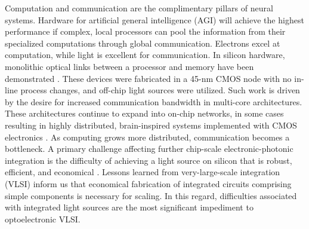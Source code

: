 \documentclass{article}
\begin{document}
\begin{multicols}{2}
Computation and communication are the complimentary pillars of neural systems. Hardware for artificial general intelligence (AGI) will achieve the highest performance if complex, local processors can pool the information from their specialized computations through global communication. Electrons excel at computation, while light is excellent for communication. In silicon hardware, monolithic optical links between a processor and memory have been demonstrated \cite{suwa2015}. These devices were fabricated in a 45-nm CMOS node with no in-line process changes, and off-chip light sources were utilized. Such work is driven by the desire for increased communication bandwidth in multi-core architectures. These architectures continue to expand into on-chip networks, in some cases resulting in highly distributed, brain-inspired systems implemented with CMOS electronics \cite{bo2000,pfgr2013,mear2014,fuga2014,payu2017,dasr2018}. As computing grows more distributed, communication becomes a bottleneck. A primary challenge affecting further chip-scale electronic-photonic integration is the difficulty of achieving a light source on silicon that is robust, efficient, and economical \cite{libo2010,zhyi2015}. Lessons learned from very-large-scale integration (VLSI) inform us that economical fabrication of integrated circuits comprising simple components is necessary for scaling. In this regard, difficulties associated with integrated light sources are the most significant impediment to optoelectronic VLSI.


\end{multicols}
\end{document}
